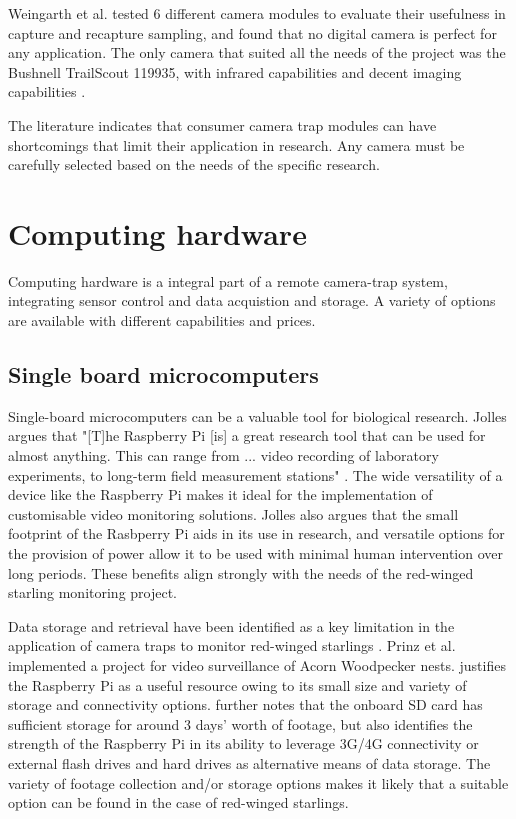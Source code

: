 \documentclass[class=report,11pt,crop=false]{standalone}
\begin{document}
Weingarth et al. \cite{weingarth2013evaluation} tested 6 different camera modules to evaluate their usefulness in capture and recapture sampling, and found that no digital camera is perfect for any application. The only camera that suited all the needs of the project was the Bushnell TrailScout 119935, with infrared capabilities and decent imaging capabilities \cite{weingarth2013evaluation}. 

The literature indicates that consumer camera trap modules can have shortcomings that limit their application in research. Any camera must be carefully selected based on the needs of the specific research.

\section{Computing hardware}

Computing hardware is a integral part of a remote camera-trap system, integrating sensor control and data acquistion and storage. A variety of options are available with different capabilities and prices.

\subsection{Single board microcomputers}

Single-board microcomputers can be a valuable tool for biological research. Jolles argues that "[T]he Raspberry Pi [is] a great research tool that can be used for almost anything. This can range from ... video recording of laboratory experiments, to long-term field measurement stations" \cite{jolles2021broad-scale}. The wide versatility of a device like the Raspberry Pi makes it ideal for the implementation of customisable video monitoring solutions. Jolles \cite{jolles2021broad-scale} also argues that the small footprint of the Rasbperry Pi aids in its use in research, and versatile options for the provision of power allow it to be used with minimal human intervention over long periods. These benefits align strongly with the needs of the red-winged starling monitoring project.

Data storage and retrieval have been identified as a key limitation in the application of camera traps to monitor red-winged starlings \cite{hofmeyer2024private}. Prinz et al. \cite{prinz2016a} implemented a project for video surveillance of Acorn Woodpecker nests. \cite{prinz2016a} justifies the Raspberry Pi as a useful resource owing to its small size and variety of storage and connectivity options. \cite{prinz2016a} further notes that the onboard SD card has sufficient storage for around 3 days' worth of footage, but also identifies the strength of the Raspberry Pi in its ability to leverage 3G/4G connectivity or external flash drives and hard drives as alternative means of data storage.  The variety of footage collection and/or storage options makes it likely that a suitable option can be found in the case of red-winged starlings.
\end{document}
